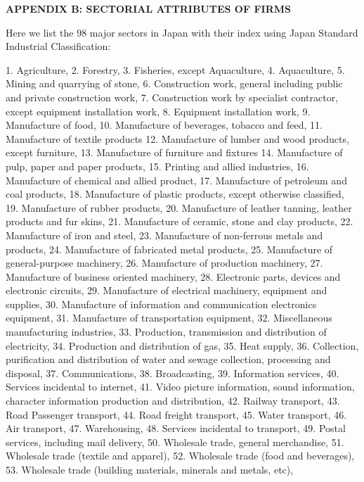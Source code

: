 \documentclass[pre,floatfix,twocolumn,showpacs,a4paper,nofootinbib]{revtex4}
\begin{document}
\begin{center}
{\bf APPENDIX B: SECTORIAL ATTRIBUTES OF FIRMS}
\end{center}
Here we list  the $98$ major sectors in Japan with their index using Japan Standard Industrial Classification:

1. Agriculture, 2. Forestry, 3. Fisheries, except Aquaculture, 4. Aquaculture, 5. Mining and quarrying of stone, 6. Construction work, general including public and private construction work,
7. Construction work by specialist contractor, except equipment installation work, 8. Equipment installation work, 9. Manufacture of food, 10. Manufacture of beverages, tobacco and feed,
11. Manufacture of textile products 12. Manufacture of lumber and wood products, except furniture, 13. Manufacture of furniture and fixtures
14. Manufacture of pulp, paper and paper products, 15. Printing and allied industries, 16. Manufacture of chemical and allied product, 17. Manufacture of petroleum and coal products,
18. Manufacture of plastic products, except otherwise classified, 19. Manufacture of rubber products, 20. Manufacture of leather tanning, leather products and fur skins,
21. Manufacture of ceramic, stone and clay products, 22. Manufacture of iron and steel, 23. Manufacture of non-ferrous metals and products, 24. Manufacture of fabricated metal products,
25. Manufacture of general-purpose machinery, 26. Manufacture of production machinery, 27. Manufacture of business oriented machinery, 28. Electronic parts, devices and electronic circuits,
29. Manufacture of electrical machinery, equipment and supplies, 30. Manufacture of information and communication electronics equipment, 31. Manufacture of transportation equipment,
32. Miscellaneous manufacturing industries, 33. Production, transmission and distribution of electricity, 34. Production and distribution of gas, 35. Heat supply,
36. Collection, purification and distribution of water and sewage collection, processing and disposal, 37. Communications, 38. Broadcasting, 39. Information services,
40. Services incidental to internet, 41. Video picture information, sound information, character information production and distribution, 42. Railway transport, 43. Road Passenger transport,
44. Road freight transport, 45. Water transport,  46. Air transport, 47. Warehousing, 48. Services incidental to transport, 49. Postal services, including mail delivery, 
50. Wholesale trade, general merchandise, 51. Wholesale trade (textile and apparel), 52. Wholesale trade (food and beverages), 53. Wholesale trade (building materials, minerals and metals, etc),
\end{document}
